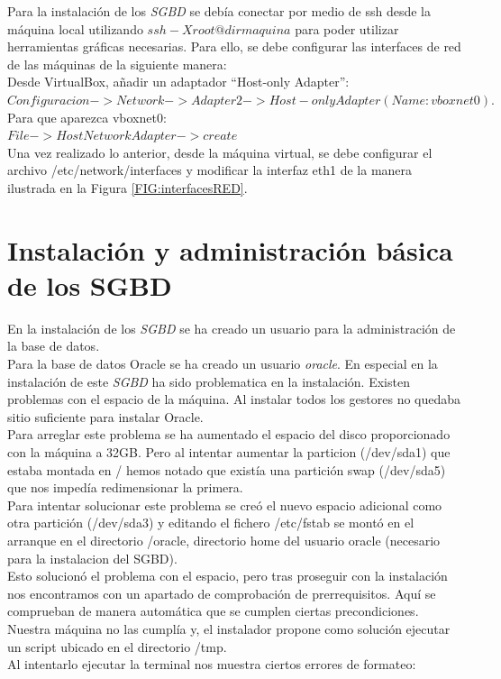 \documentclass{article}
\begin{document}
Para la instalación de los \emph{SGBD} se debía conectar por medio de ssh  desde la máquina local utilizando $ssh -X root@dirmaquina$ para poder utilizar herramientas gráficas necesarias. Para ello, se debe configurar las interfaces de red de las máquinas de la siguiente manera:\\
Desde VirtualBox, añadir un adaptador “Host-only Adapter”:\\
$Configuracion->Network->Adapter2->Host-only Adapter (Name: vboxnet0).$
\\
Para que aparezca vboxnet0:\\
$File->Host Network Adapter->create$
\\
Una vez realizado lo anterior, desde la máquina virtual, se debe configurar el archivo /etc/network/interfaces y modificar la interfaz eth1 de la manera ilustrada en la Figura \ref{FIG:interfacesRED}.


\section{Instalación y administración básica de los SGBD}

En la instalación de los \emph{SGBD} se ha creado un usuario para la administración de la base de datos.\\
Para la base de datos Oracle se ha creado un usuario \emph{oracle}. En especial en la instalación de este \emph{SGBD} ha sido problematica en la instalación. Existen problemas con el espacio de la máquina. Al instalar todos los gestores no quedaba sitio suficiente para instalar Oracle.\\
Para arreglar este problema se ha aumentado el espacio del disco proporcionado con la máquina a 32GB. Pero al intentar aumentar la particion (/dev/sda1)
que estaba montada en / hemos notado que existía una partición swap (/dev/sda5) que nos impedía redimensionar la primera.\\
Para intentar solucionar este problema se creó el nuevo espacio adicional como otra partición (/dev/sda3) y editando el fichero /etc/fstab se montó en el arranque
en el directorio /oracle, directorio home del usuario oracle (necesario para la instalacion del SGBD).\\
Esto solucionó el problema con el espacio, pero tras proseguir con la instalación nos encontramos con un apartado de comprobación de prerrequisitos. Aquí se comprueban
de manera automática que se cumplen ciertas precondiciones. Nuestra máquina no las cumplía y, el instalador propone como solución ejecutar un script ubicado en el directorio
/tmp.\\
Al intentarlo ejecutar la terminal nos muestra ciertos errores de formateo:
\end{document}
